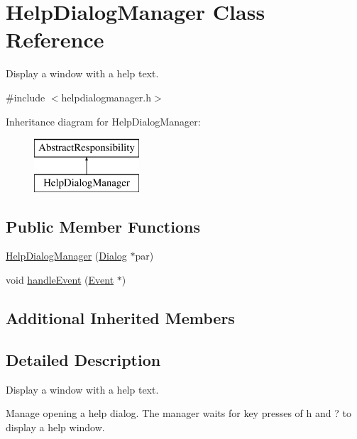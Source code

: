 \hypertarget{classHelpDialogManager}{\section{Help\-Dialog\-Manager Class Reference}
\label{classHelpDialogManager}
}


Display a window with a help text.  




{\ttfamily \#include $<$helpdialogmanager.\-h$>$}

Inheritance diagram for Help\-Dialog\-Manager\-:\begin{figure}[H]
\begin{center}
\leavevmode
\includegraphics[height=2.000000cm]{classHelpDialogManager}
\end{center}
\end{figure}
\subsection*{Public Member Functions}
\begin{DoxyCompactItemize}
\item 
\hyperlink{classHelpDialogManager_a49833ac06771933b331799ee2ce42dc7}{Help\-Dialog\-Manager} (\hyperlink{classDialog}{Dialog} $\ast$par)
\item 
void \hyperlink{classHelpDialogManager_a5f4d590400c9dc4c3120f8d15ce6b977}{handle\-Event} (\hyperlink{classEvent}{Event} $\ast$)
\end{DoxyCompactItemize}
\subsection*{Additional Inherited Members}


\subsection{Detailed Description}
Display a window with a help text. 

Manage opening a help dialog. The manager waits for key presses of h and ? to display a help window. 

